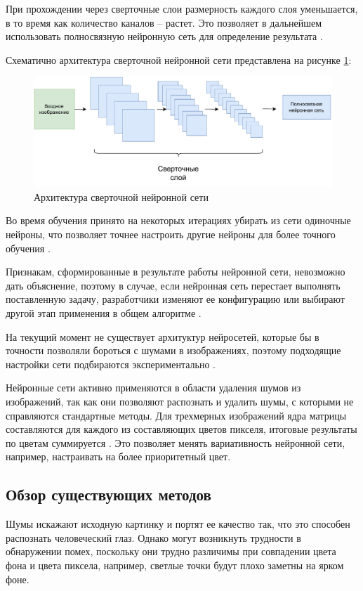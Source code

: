 При прохождении через сверточные слои размерность каждого слоя уменьшается, в то время как количество каналов -- растет.
Это позволяет в дальнейшем использовать полносвязную нейронную сеть для определение результата \cite{CNN_arch}.

Схематично архитектура сверточной нейронной сети представлена на рисунке \ref{analit::CNN}:
\FloatBarrier
\begin{figure}[h]	
	\begin{center}
		\includegraphics[width=\linewidth]{inc/pdf/CNN.pdf}
	\end{center}
	\captionsetup{justification=centering}
	\caption{Архитектура сверточной нейронной сети}
	\label{analit::CNN}
\end{figure}
\FloatBarrier

Во время обучения принято на некоторых итерациях убирать из сети одиночные нейроны, что позволяет точнее настроить другие нейроны для более точного обучения \cite{ridnet}.

Признакам, сформированные в результате работы нейронной сети, невозможно дать объяснение, поэтому в случае, если нейронная сеть перестает выполнять поставленную задачу, разработчики изменяют ее конфигурацию или выбирают другой этап применения в общем алгоритме \cite{CNN_2}. 

На текущий момент не существует архитуктур нейросетей, которые бы в точности позволяли бороться с шумами в изображениях, поэтому подходящие настройки сети подбираются экспериментально \cite{neural}.

Нейронные сети активно применяются в области удаления шумов из изображений, так как они позволяют распознать и удалить шумы, с которыми не справляются стандартные методы.
Для трехмерных изображений ядра матрицы составляются для каждого из составляющих цветов пикселя, итоговые результаты по цветам суммируется \cite{ridnet}. 
Это позволяет менять вариативность нейронной сети, например, настраивать на более приоритетный цвет.

\subsection{Обзор существующих методов}
Шумы искажают исходную картинку и портят ее качество так, что это способен распознать человеческий глаз.
Однако могут возникнуть трудности в обнаружении помех, поскольку они трудно различимы при совпадении цвета фона и цвета пиксела, например, светлые точки будут плохо заметны на ярком фоне.

